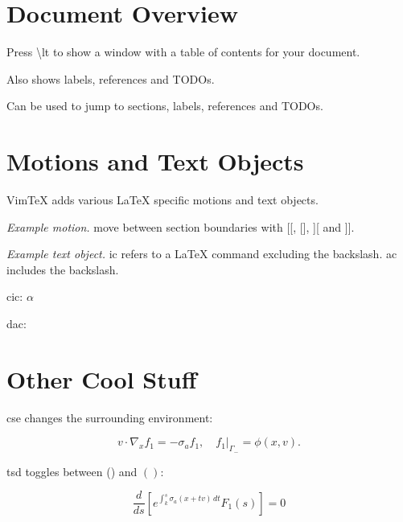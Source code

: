 \documentclass{article}
\newcommand{\lt}{\textbackslash{}lt }
\begin{document}
\section{Document Overview}

Press \lt to show a window with a table of contents for your document.

Also shows labels, references and TODOs. 

Can be used to jump to sections, labels, references and TODOs.















\section{Motions and Text Objects}

VimTeX adds various LaTeX specific motions and text objects.

\emph{Example motion.} move between section boundaries with [[, [], ][ and ]].

\emph{Example text object.} ic refers to a LaTeX command excluding the
backslash. ac includes the backslash.

cic: \( \alpha \)

dac: \(  \)











\section{Other Cool Stuff}

cse changes the surrounding environment:

\begin{equation}
  v \cdot \nabla_x f_1 = -\sigma_a f_1, \quad f_1 \rvert_{\Gamma_-} = \phi(x,v).
\end{equation}

tsd toggles between () and \( \left( \right) \):

\begin{equation*}
  \frac{d}{ds} \left[ e^{\int_k^s \sigma_a(x + tv)\,dt} F_1(s) \right] = 0
\end{equation*}
\end{document}
